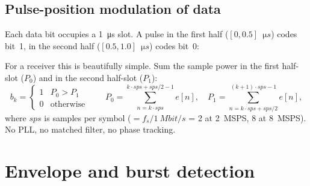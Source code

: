 \documentclass[11pt,a4paper]{article}
\begin{document}
\subsection{Pulse-position modulation of data}

Each data bit occupies a \SI{1}{\micro s} slot.  A pulse in the first
half ($[0, 0.5]$~$\si{\micro s}$) codes bit~1, in the second half
($[0.5, 1.0]$~$\si{\micro s}$) codes bit~0:

\begin{center}
\end{center}

For a receiver this is beautifully simple.  Sum the sample power in the
first half-slot ($P_0$) and in the second half-slot ($P_1$):
\begin{equation}
b_k = \begin{cases} 1 & P_0 > P_1 \\ 0 & \text{otherwise} \end{cases}
\qquad
P_0 = \!\!\!\!\!\sum_{n=k\cdot sps}^{k\cdot sps+sps/2 - 1}\!\!\!\!e[n],
\quad
P_1 = \!\!\!\!\!\!\!\sum_{n=k\cdot sps+sps/2}^{(k+1)\cdot sps - 1}\!\!\!\!e[n],
\end{equation}
where $sps$ is samples per symbol ($= f_s / \SI{1}{Mbit/s}$ = 2 at
\SI{2}{MSPS}, 8 at \SI{8}{MSPS}).  No PLL, no matched filter, no phase
tracking.

\section{Envelope and burst detection}\label{sec:preamble}
\end{document}
